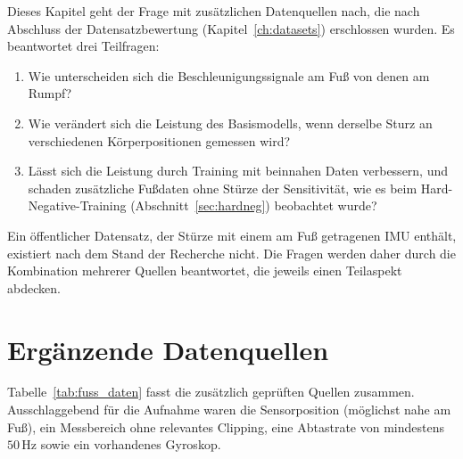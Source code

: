 \documentclass[11pt,a4paper,oneside]{report}
\begin{document}
Dieses Kapitel geht der Frage mit zusätzlichen Datenquellen nach, die
nach Abschluss der Datensatzbewertung (Kapitel~\ref{ch:datasets})
erschlossen wurden. Es beantwortet drei Teilfragen:

\begin{enumerate}
\item Wie unterscheiden sich die Beschleunigungssignale am Fuß von
      denen am Rumpf?
\item Wie verändert sich die Leistung des Basismodells, wenn derselbe
      Sturz an verschiedenen Körperpositionen gemessen wird?
\item Lässt sich die Leistung durch Training mit beinnahen Daten
      verbessern, und schaden zusätzliche Fußdaten ohne Stürze der
      Sensitivität, wie es beim Hard-Negative-Training
      (Abschnitt~\ref{sec:hardneg}) beobachtet wurde?
\end{enumerate}

Ein öffentlicher Datensatz, der Stürze mit einem am Fuß getragenen
\ac{IMU} enthält, existiert nach dem Stand der Recherche nicht. Die
Fragen werden daher durch die Kombination mehrerer Quellen beantwortet,
die jeweils einen Teilaspekt abdecken.

\section{Ergänzende Datenquellen}
\label{sec:fuss_daten}

Tabelle~\ref{tab:fuss_daten} fasst die zusätzlich geprüften Quellen
zusammen. Ausschlaggebend für die Aufnahme waren die Sensorposition
(möglichst nahe am Fuß), ein Messbereich ohne relevantes Clipping, eine
Abtastrate von mindestens $50$\,Hz sowie ein vorhandenes Gyroskop.
\end{document}
